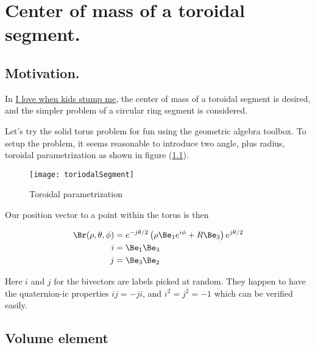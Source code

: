 
%

\chapter{Center of mass of a toroidal segment.}
\label{chap:torusCenterOfMass}
{}
\date{May 15, 2010}

\beginArtNoToc

\section{Motivation.}

In \href{http://samjshah.com/2010/05/05/i-love-when-kids-stump-me/}{I love when kids stump me}, the center of mass of a toroidal segment is desired, and the simpler problem of a circular ring segment is considered.

Let's try the solid torus problem for fun using the geometric algebra toolbox.  To setup the problem, it seems reasonable to introduce two angle, plus radius, toroidal parametrization as shown in figure (\ref{fig:toriodalSegment}).

\begin{figure}[htp]
\centering
\texttt{[image: toriodalSegment]}
\caption{Toroidal parametrization}\label{fig:toriodalSegment}
\end{figure}

Our position vector to a point within the torus is then

\begin{subequations}
\begin{align}\label{eqn:torusCenterOfMass:1}
\Br(\rho, \theta, \phi) &= e^{-j\theta/2} \left( \rho \Be_1 e^{ i \phi } + R \Be_3 \right) e^{j \theta/2} \\
i &= \Be_1 \Be_3 \\
j &= \Be_3 \Be_2 
\end{align}
\end{subequations}

Here $i$ and $j$ for the bivectors are labels picked at random.  They happen to have the quaternion-ic properties $i j = -j i$, and $i^2 = j^2 = -1$ which can be verified easily.

\section{Volume element}

